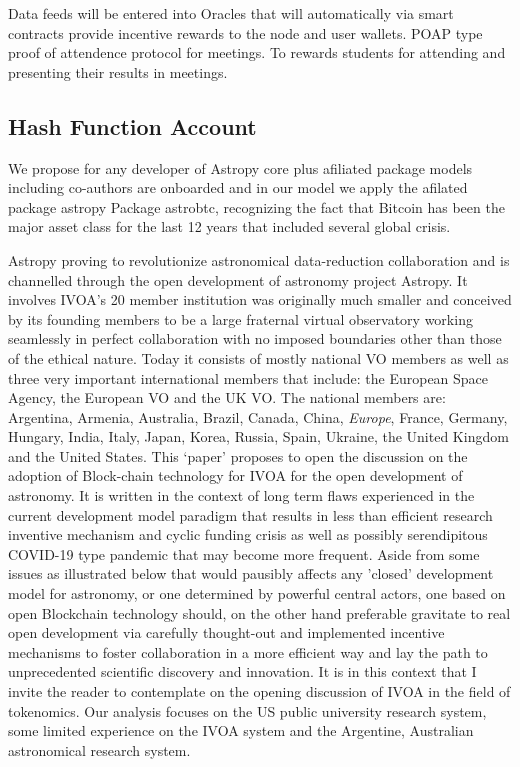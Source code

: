 \documentclass[final,5p,times,twocolumn,authoryear]{elsarticle}
\begin{document}
Data feeds will be entered into Oracles that will automatically via smart contracts provide incentive rewards to the node and user wallets.
%
POAP type proof of attendence protocol for meetings. To rewards students for attending and presenting their results in meetings.
%
\subsection{Hash Function Account}
We propose for any developer of Astropy core plus afiliated package models including co-authors are onboarded and in our model we apply the afilated package astropy Package astrobtc, recognizing the fact that Bitcoin has been the major asset class for the last 12 years that included several global crisis. 
%

Astropy proving to revolutionize astronomical data-reduction collaboration and is channelled through the open development of astronomy project Astropy. It involves IVOA's 20 member institution was originally much smaller and conceived by its founding members to be a large fraternal virtual observatory working seamlessly in perfect collaboration with no imposed boundaries other than those of the ethical nature. Today it consists of mostly national VO members as well as three very important international members that include: the European Space Agency, the European VO and the UK VO. The national members are: Argentina, Armenia, Australia, Brazil, Canada, China, \textit{Europe}, France, Germany, Hungary, India, Italy, Japan, Korea, Russia, Spain, Ukraine, the United Kingdom and the United States. This `paper' proposes to open the discussion on the adoption of Block-chain technology for IVOA for the open development of astronomy. It is written in the context of long term flaws experienced in the current development model paradigm that results in less than efficient research inventive mechanism and cyclic funding crisis as well as possibly serendipitous COVID-19 type pandemic that may become more frequent.
%
Aside from some issues as illustrated below that would pausibly affects any 'closed' development model for astronomy, or one determined by powerful central actors, one based on open Blockchain technology should, on the other hand preferable gravitate to real open development via carefully thought-out and implemented incentive mechanisms to foster collaboration in a more efficient way and lay the path to unprecedented scientific discovery and innovation. It is in this context that I invite the reader to contemplate on the opening discussion of IVOA in the field of tokenomics. 
%
Our analysis focuses on the US public university research system, some limited experience on the IVOA system and the Argentine, Australian astronomical research system. 
   
\end{document}
